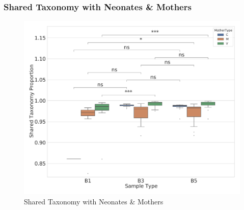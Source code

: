 \documentclass{beamer}
\begin{document}
    \begin{frame}
        \frametitle{Shared Taxonomy with Neonates \& Mothers}

        \begin{figure}
            \includegraphics[width=0.6 \linewidth]{figures/Step48/everything.DADA2.homd.pdf}
            \caption{Shared Taxonomy with Neonates \& Mothers}
        \end{figure}
    \end{frame}
\end{document}
